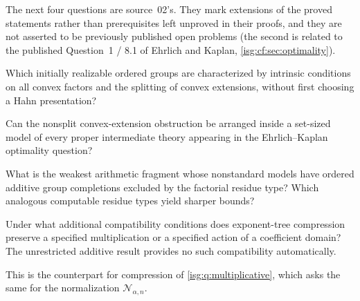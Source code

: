 \documentclass[11pt]{article}
\theoremstyle{definition}
\theoremstyle{remark}
\newcommand{\Rect}{\mathcal{N}_{\alpha,n}}
\begin{document}
The next four questions are source~02's. They mark extensions of the
proved statements rather than prerequisites left unproved in their
proofs, and they are not asserted to be previously published open
problems (the second is related to the published Question~1 / 8.1 of
Ehrlich and Kaplan, \cref{isg:cf:sec:optimality}).

\begin{question}\label{isg:cf:q:intrinsic}
Which initially realizable ordered groups are characterized by intrinsic
conditions on all convex factors and the splitting of convex extensions,
without first choosing a Hahn presentation?
\end{question}

\begin{question}\label{isg:cf:q:intermediate}
Can the nonsplit convex-extension obstruction be arranged inside a
set-sized model of every proper intermediate theory appearing in the
Ehrlich--Kaplan optimality question?
\end{question}

\begin{question}\label{isg:cf:q:fragment}
What is the weakest arithmetic fragment whose nonstandard models have
ordered additive group completions excluded by the factorial residue
type? Which analogous computable residue types yield sharper bounds?
\end{question}

\begin{question}\label{isg:cf:q:multiplicative}
Under what additional compatibility conditions does exponent-tree
compression preserve a specified multiplication or a specified action
of a coefficient domain? The unrestricted additive result provides no
such compatibility automatically.
\end{question}
This is the counterpart for compression of \cref{isg:q:multiplicative},
which asks the same for the normalization $\Rect$.
\end{document}
